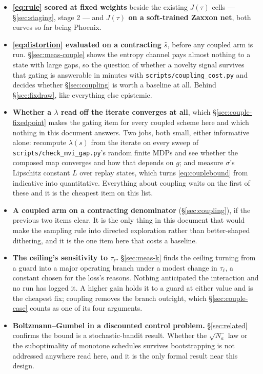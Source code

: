 \documentclass{article}
\newcommand{\srank}{\sigma}
\begin{document}
\begin{itemize}
  checkpoints while \texttt{quantile\_embedding}'s bias grows by orders (\S\ref{sec:denoms}).
  Compare it
  against the realised dispersion of Monte-Carlo returns from the same states.
  \item \textbf{\eqref{eq:rule} scored at fixed weights} beside the existing $J(\tau)$ cells ---
  \S\ref{sec:staging}, stage 2 --- and \textbf{$J(\tau)$ on a soft-trained Zaxxon net}, both curves
  so far being Phoenix.
  \item \textbf{\eqref{eq:distortion} evaluated on a contracting $\hat{s}$}, before any coupled
  arm is run. \S\ref{sec:meas-couple} shows the entropy channel pays almost nothing to a state
  with large gaps, so the question of whether a novelty signal survives that gating is answerable
  in minutes with \texttt{scripts/coupling\_cost.py} and decides whether \S\ref{sec:coupling} is
  worth a baseline at all. Behind \S\ref{sec:fixdraw}, like everything else epistemic.
  \item \textbf{Whether a $\lambda$ read off the iterate converges at all}, which
  \S\ref{sec:couple-fixedpoint} makes the gating item for every coupled scheme here and which
  nothing in this document answers. Two jobs, both small, either informative alone:
  recompute $\lambda(s)$ from the iterate on every sweep of \texttt{scripts/check\_mvi\_gap.py}'s
  random finite MDPs and see whether the composed map converges and how that depends on $g$; and
  measure $\srank$'s Lipschitz constant $L$ over replay states, which turns
  \eqref{eq:couplebound} from indicative into quantitative. Everything about coupling waits on
  the first of these and it is the cheapest item on this list.
  \item \textbf{A coupled arm on a contracting denominator} (\S\ref{sec:coupling}), if the
  previous two items clear. It is the only thing in this document that would make the sampling
  rule into directed exploration rather than better-shaped dithering, and it is the one item here
  that costs a baseline.
  \item \textbf{The ceiling's sensitivity to $\tau_\ell$.} \S\ref{sec:meas-k} finds the ceiling
  turning from a guard into a major operating branch under a modest change in $\tau_\ell$, a
  constant chosen for the loss's reasons. Nothing anticipated the interaction and no run has
  logged it. A higher gain holds it to a guard at either value and is the cheapest fix; coupling
  removes the branch outright, which \S\ref{sec:couple-case} counts as one of its four arguments.
  \item \textbf{Boltzmann--Gumbel in a discounted control problem.} \S\ref{sec:related} confirms
  the bound is a stochastic-bandit result. Whether the $\sqrt{N_a}$ law or the suboptimality of
  monotone schedules survives bootstrapping is not addressed anywhere read here, and it is the
  only formal result near this design.
\end{itemize}
\end{document}
